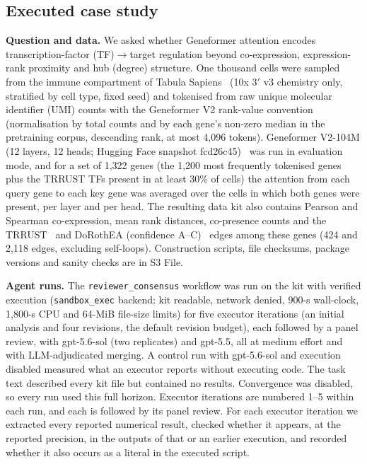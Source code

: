 \subsection*{Executed case study}

\textbf{Question and data.} We asked whether Geneformer attention encodes transcription-factor (TF)$\to$target regulation beyond co-expression, expression-rank proximity and hub (degree) structure. One thousand cells were sampled from the immune compartment of Tabula Sapiens~\cite{tabulasapiens2022} (10x 3$'$ v3 chemistry only, stratified by cell type, fixed seed) and tokenised from raw unique molecular identifier (UMI) counts with the Geneformer V2 rank-value convention (normalisation by total counts and by each gene's non-zero median in the pretraining corpus, descending rank, at most 4,096 tokens). Geneformer V2-104M (12 layers, 12 heads; Hugging Face snapshot fcd26c45)~\cite{theodoris2023transfer} was run in evaluation mode, and for a set of 1,322 genes (the 1,200 most frequently tokenised genes plus the TRRUST TFs present in at least 30\% of cells) the attention from each query gene to each key gene was averaged over the cells in which both genes were present, per layer and per head. The resulting data kit also contains Pearson and Spearman co-expression, mean rank distances, co-presence counts and the TRRUST~\cite{han2018trrust} and DoRothEA (confidence A--C)~\cite{garciaalonso2019dorothea} edges among these genes (424 and 2,118 edges, excluding self-loops). Construction scripts, file checksums, package versions and sanity checks are in S3 File.

\textbf{Agent runs.} The \texttt{reviewer\_consensus} workflow was run on the kit with verified execution (\texttt{sandbox\_exec} backend; kit readable, network denied, 900-s wall-clock, 1,800-s CPU and 64-MiB file-size limits) for five executor iterations (an initial analysis and four revisions, the default revision budget), each followed by a panel review, with gpt-5.6-sol (two replicates) and gpt-5.5, all at medium effort and with LLM-adjudicated merging. A control run with gpt-5.6-sol and execution disabled measured what an executor reports without executing code. The task text described every kit file but contained no results. Convergence was disabled, so every run used this full horizon. Executor iterations are numbered 1--5 within each run, and each is followed by its panel review. For each executor iteration we extracted every reported numerical result, checked whether it appears, at the reported precision, in the outputs of that or an earlier execution, and recorded whether it also occurs as a literal in the executed script.

